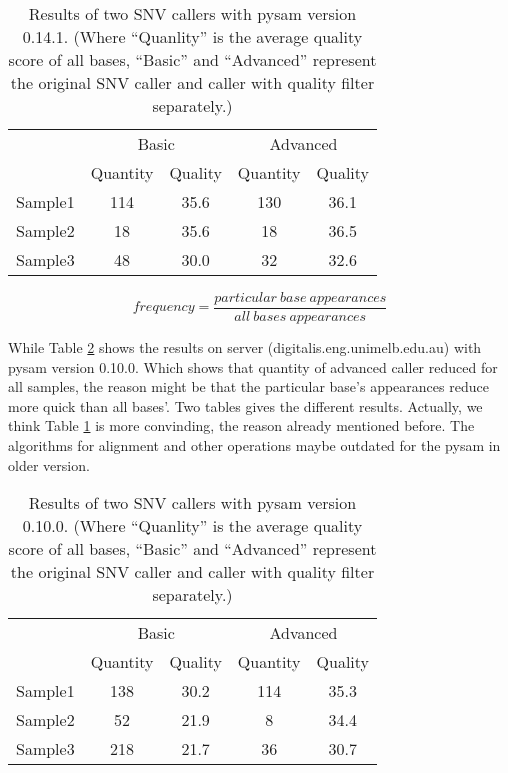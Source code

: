 \documentclass[a4paper]{article}
\begin{document}
\begin{table}[H]
	\centering
	\begin{tabular}{c|cc|cc}
		\hline
		 & \multicolumn{2}{c|}{Basic}  &  \multicolumn{2}{c}{Advanced}   \\
		 &	Quantity & Quality & Quantity & Quality \\	 
		\hline
		Sample1 & 114  & 35.6 & 130 & 36.1 \\
		\hline
		Sample2 & 18 & 35.6 & 18 & 36.5  \\
		\hline
		Sample3 & 48 & 30.0 & 32 & 32.6  \\
		\hline
	\end{tabular}
	\caption{\label{tab:1}Results of two SNV callers with pysam version 0.14.1. (Where ``Quanlity'' is the average quality score of all bases, ``Basic'' and ``Advanced'' represent the original SNV caller and caller with quality filter separately.)}
\end{table}

\begin{equation}
frequency = \frac{particular\ base\ appearances}{all\ bases\ appearances}
\label{fun1}
\end{equation}

While Table \ref{tab:2} shows the results on server (digitalis.eng.unimelb.edu.au) with pysam version 0.10.0. Which shows that quantity of advanced caller reduced for all samples, the reason might be that the particular base's appearances reduce more quick than all bases'. Two tables gives the different results. Actually, we think Table \ref{tab:1} is more convinding, the reason already mentioned before. The algorithms for alignment and other operations maybe outdated for the pysam in older version.

\begin{table}[H]
	\centering
	\begin{tabular}{c|cc|cc}
		\hline
		& \multicolumn{2}{c|}{Basic}  &  \multicolumn{2}{c}{Advanced}   \\
		&	Quantity & Quality & Quantity & Quality \\	 
		\hline
		Sample1 & 138  & 30.2 & 114 & 35.3 \\
		\hline
		Sample2 & 52 & 21.9 & 8 & 34.4  \\
		\hline
		Sample3 & 218 & 21.7 & 36 & 30.7  \\
		\hline
	\end{tabular}
	\caption{\label{tab:2}Results of two SNV callers with pysam version 0.10.0. (Where ``Quanlity'' is the average quality score of all bases, ``Basic'' and ``Advanced'' represent the original SNV caller and caller with quality filter separately.)}
\end{table}
\end{document}
